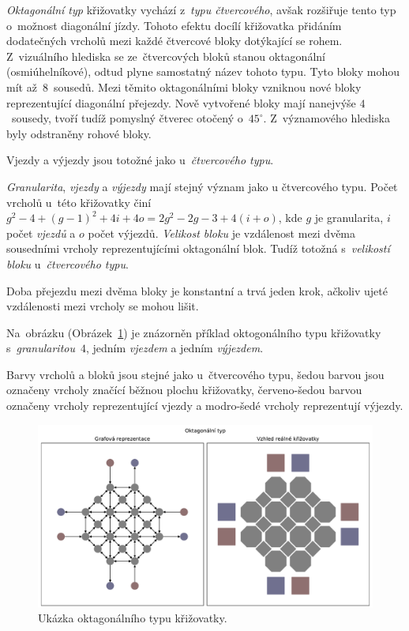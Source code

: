 \emph{Oktagonální typ} křižovatky vychází z~\emph{typu čtvercového}, avšak rozšiřuje tento typ o~možnost diagonální jízdy.
Tohoto efektu docílí křižovatka přidáním dodatečných vrcholů mezi každé čtvercové bloky dotýkající se rohem.
Z~vizuálního hlediska se ze~čtvercových bloků stanou oktagonální (osmiúhelníkové), odtud plyne samostatný název tohoto typu.
Tyto bloky mohou mít až~$8$~sousedů.
Mezi těmito oktagonálními bloky vzniknou nové bloky reprezentující diagonální přejezdy.
Nově vytvořené bloky mají nanejvýše $4$~sousedy, tvoří tudíž pomyslný čtverec otočený o~$45^{\circ}$.
Z~významového hlediska byly odstraněny rohové bloky.

Vjezdy a výjezdy jsou totožné jako u~\emph{čtvercového typu}.

\emph{Granularita}, \emph{vjezdy} a \emph{výjezdy} mají stejný význam jako u čtvercového typu.
Počet vrcholů u~této křižovatky činí $g^2 - 4 + (g-1)^2 + 4i + 4o = 2g^2 - 2g - 3 + 4(i + o)$,
kde $g$ je granularita, $i$ počet \emph{vjezdů} a $o$ počet výjezdů.
\emph{Velikost bloku} je vzdálenost mezi dvěma sousedními vrcholy reprezentujícími oktagonální blok.
Tudíž totožná s~\emph{velikostí bloku} u~\emph{čtvercového typu}.

Doba přejezdu mezi dvěma bloky je konstantní a trvá jeden krok, ačkoliv ujeté vzdálenosti mezi vrcholy se mohou lišit.

Na~obrázku (Obrázek~\ref{fig:octagonal_type_graph}) je znázorněn příklad oktogonálního typu křižovatky s~\emph{granularitou}~$4$,
jedním \emph{vjezdem} a jedním \emph{výjezdem}.

Barvy vrcholů a bloků jsou stejné jako u~čtvercového typu, šedou barvou jsou označeny vrcholy značící běžnou plochu křižovatky,
červeno-šedou barvou označeny vrcholy reprezentující vjezdy a modro-šedé vrcholy reprezentují výjezdy.

\begin{figure}[h]
	\centering
	\includegraphics[width=\textwidth]{../img/Octagonal_grid}
	\caption{Ukázka oktagonálního typu křižovatky.}
	\label{fig:octagonal_type_graph}
\end{figure}

